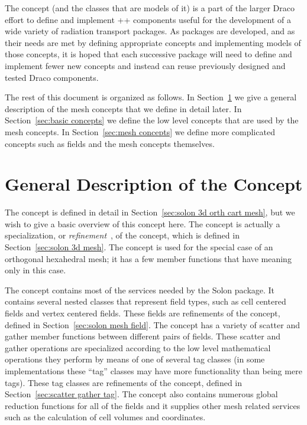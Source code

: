 \documentclass[11pt]{rnote}
\begin{document}
The  concept (and the
classes that are models of it) is a
part of the larger Draco effort to define and implement \C++ components 
useful for the development of a wide variety of radiation transport
packages. As packages are developed, and as their needs are met by
defining appropriate concepts and implementing models of those
concepts, it is hoped that each successive package will need to define 
and implement fewer new concepts and instead can reuse previously
designed and tested Draco components.

The rest of this document is organized as follows. In
Section~\ref{sec:general description} we give a general description of 
the mesh concepts that we define in detail later. In
Section~\ref{sec:basic concepts} we define the low level concepts that 
are used by the mesh concepts. In Section~\ref{sec:mesh concepts} we
define more complicated concepts such as fields and the mesh concepts
themselves.


\section{General Description of the  Concept}
\label{sec:general description}

The  concept is defined in 
detail in Section~\ref{sec:solon 3d orth cart mesh}, but we wish to
give a basic overview of this
concept here. The  concept
is actually a specialization, or {\it refinement}~\cite{au99}, of the
 concept, which is defined in
Section~\ref{sec:solon 3d mesh}. The
 concept is used for the
special case of an orthogonal hexahedral mesh; it has a few member
functions that have meaning only in this case.

The  concept contains most of the services
needed by the Solon package. It contains several nested classes that
represent field types, such as cell centered fields and vertex
centered fields. These fields are refinements of the  concept, defined in Section~\ref{sec:solon mesh
  field}. The  concept has a variety of scatter and gather member functions
between different pairs of fields. These scatter and gather operations 
are specialized according to the low level mathematical operations
they perform by means of one of several tag classes (in some
implementations these ``tag'' classes may have more functionality than 
being mere tags). These tag classes are refinements of the
 concept, defined in
Section~\ref{sec:scatter gather tag}. The
 concept also contains numerous global
reduction functions for all of the fields and it supplies other mesh
related services such as the calculation of cell volumes and
coordinates.
\end{document}
